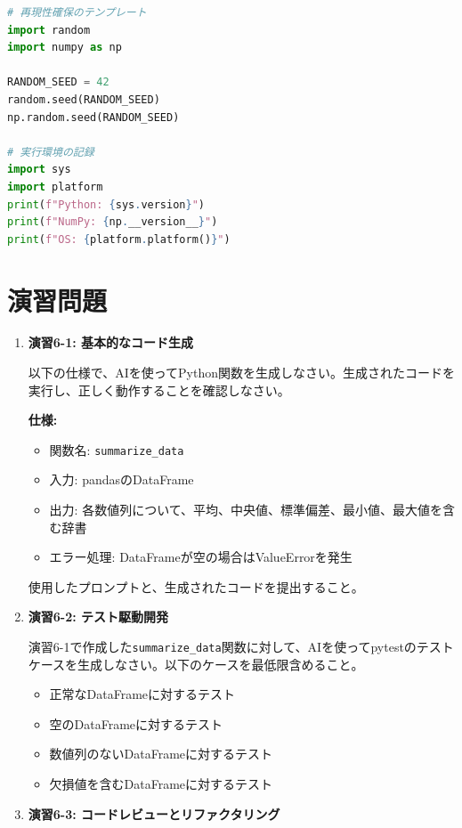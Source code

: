 \begin{lstlisting}[language=Python]
# 再現性確保のテンプレート
import random
import numpy as np

RANDOM_SEED = 42
random.seed(RANDOM_SEED)
np.random.seed(RANDOM_SEED)

# 実行環境の記録
import sys
import platform
print(f"Python: {sys.version}")
print(f"NumPy: {np.__version__}")
print(f"OS: {platform.platform()}")
\end{lstlisting}

\section*{演習問題}

\begin{enumerate}

\item \textbf{演習6-1: 基本的なコード生成}

以下の仕様で、AIを使ってPython関数を生成しなさい。生成されたコードを実行し、正しく動作することを確認しなさい。

\textbf{仕様:}
\begin{itemize}
\item 関数名: \texttt{summarize\_data}
\item 入力: pandasのDataFrame
\item 出力: 各数値列について、平均、中央値、標準偏差、最小値、最大値を含む辞書
\item エラー処理: DataFrameが空の場合はValueErrorを発生
\end{itemize}

使用したプロンプトと、生成されたコードを提出すること。

\item \textbf{演習6-2: テスト駆動開発}

演習6-1で作成した\texttt{summarize\_data}関数に対して、AIを使ってpytestのテストケースを生成しなさい。以下のケースを最低限含めること。

\begin{itemize}
\item 正常なDataFrameに対するテスト
\item 空のDataFrameに対するテスト
\item 数値列のないDataFrameに対するテスト
\item 欠損値を含むDataFrameに対するテスト
\end{itemize}

\item \textbf{演習6-3: コードレビューとリファクタリング}


\end{enumerate}
